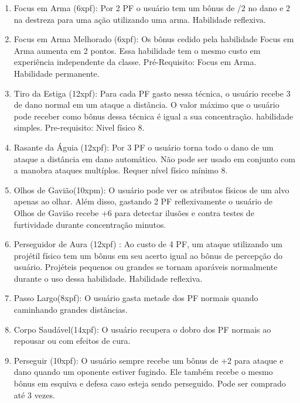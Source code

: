 \begin{enumerate}

	\item Focus em Arma (6xpf): Por 2 PF o usuário tem um bônus de /2 no dano e 2 na destreza para uma ação utilizando uma arma. Habilidade reflexiva.

	\item Focus em Arma Melhorado (6xpf): Os bônus cedido pela habilidade Focus em Arma aumenta em 2 pontos. Essa habilidade tem o mesmo custo em experiência independente da classe. Pré-Requisito: Focus em Arma. Habilidade permanente.

	\item Tiro da Estiga (12xpf): Para cada PF gasto nessa técnica, o usuário recebe 3 de dano normal em um ataque a distância. O valor máximo que o usuário pode receber como bônus dessa técnica é igual a sua concentração. habilidade simples.  Pre-requisito: Nivel físico 8.

	\item Rasante da Águia (12xpf): Por 3 PF o usuário torna todo o dano de um ataque a distância em dano automático. Não pode ser usado em conjunto com a manobra ataques multíplos. Requer nível físico mínimo 8. 
	
	\item Olhos de Gavião(10xpm): O usuário pode ver os atributos físicos de um alvo apenas ao olhar. Além disso, gastando 2 PF reflexivamente o usuário de Olhos de Gavião recebe +6 para detectar ilusões e contra testes de furtividade durante concentração minutos.
	
	\item Perseguidor de Aura (12xpf) : Ao custo de 4 PF, um ataque utilizando um projétil físico tem um bônus em seu acerto igual ao bônus de percepção do usuário. Projéteis pequenos ou grandes se tornam aparáveis normalmente durante o uso dessa habilidade. Habilidade reflexiva.

	\item Passo Largo(8xpf): O usuário gasta metade dos PF normais quando caminhando grandes distâncias.

	\item Corpo Saudável(14xpf): O usuário recupera o dobro dos PF normais ao repousar ou com efeitos de cura.
	
	\item Perseguir (10xpf): O usuário sempre recebe um bônus de +2 para ataque e dano quando um oponente estiver fugindo. Ele também recebe o mesmo bônus em esquiva e defesa caso esteja sendo perseguido. Pode ser comprado até 3 vezes.


\end{enumerate}
